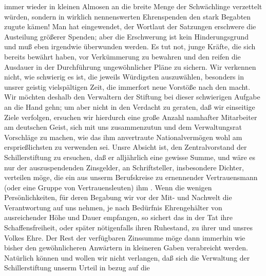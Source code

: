 \begin{ledgroupsized}[t]{13cm}
               immer wieder in kleinen Almosen an die breite Menge der Schwächlinge verzettelt
               würden, sondern in wirklich nennenswerten Ehrenspenden den stark Begabten zugute
               kämen! Man hat eingewendet, der Wortlaut der Satzungen erschwere die Austeilung
               größerer Spenden; aber die Erschwerung ist kein Hinderungsgrund und muß eben
               irgendwie überwunden werden. Es tut not, junge Kräfte, die sich bereits bewährt
               haben, vor Verkümmerung zu bewahren und den reifen die Ausdauer in der Durchführung
               ungewöhnlicher Pläne zu sichern.\pend
           \pstart
           Wir verkennen nicht, wie schwierig es ist, die jeweils Würdigsten auszuwählen,
               besonders in unsrer geistig vielspältigen Zeit, die immerfort neue Vorstöße nach den
                   macht. Wir möchten deshalb
               den Verwaltern der Stiftung bei
               dieser schwierigen Aufgabe an die Hand gehn; um aber nicht in den Verdacht zu
               geraten, daß wir einseitige Ziele verfolgen, ersuchen wir hierdurch eine große Anzahl
               namhafter Mitarbeiter am deutschen Geist, sich mit uns zusammenzutun und dem
               Verwaltungsrat Vorschläge zu {\pb}machen, wie das ihm
               anvertraute Nationalvermögen wohl am ersprießlichsten zu verwenden sei.\pend
           \pstart
           Unsre Absicht ist, den Zentralvorstand der Schillerstiftung zu ersuchen, daß er alljährlich eine gewisse Summe, und
               wäre es nur  der auszuspendenden Zinsgelder, an
                   Schriftsteller, insbesondere Dichter,
               verteilen möge, die ein aus unserm Berufskreise zu ernennender Vertrauensmann (oder
               eine Gruppe von Vertrauensleuten) ihm . Wenn die wenigen Persönlichkeiten, für deren Begabung wir vor der Mit-
               und Nachwelt die Verantwortung auf uns nehmen, je nach Bedürfnis Ehrengehälter von
               ausreichender Höhe und Dauer empfangen, so sichert das in der Tat ihre
               Schaffensfreiheit, oder später nötigenfalls ihren Ruhestand, zu ihrer und unsres
               Volkes Ehre. Der Rest der verfügbaren Zinssumme möge dann immerhin wie bisher den
               gewöhnlicheren Anwärtern in kleineren Gaben verabreicht werden.\pend
           \pstart
           Natürlich können und wollen wir nicht verlangen, daß sich die Verwaltung der Schillerstiftung unserm Urteil in bezug auf die

\end{ledgroupsized}
